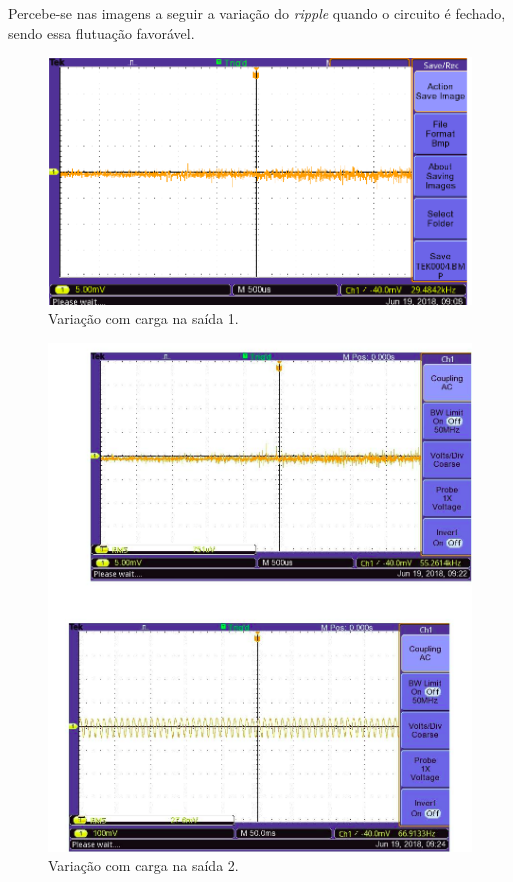 Percebe-se nas imagens a seguir a variação do \textit{ripple} quando o circuito é fechado, sendo essa flutuação favorável.

\begin{figure}[!htb]
	\centering
	\includegraphics[width=14cm]{figuras/variacao1.png}
	\caption{Variação com carga na saída 1.}
	\label{variacao1}
\end{figure}

\begin{figure}[!htb]
	\centering
	\includegraphics[width=14cm]{figuras/variacao2.png}
	\caption{Variação com carga na saída 2.}
	\label{variacao2}
\end{figure}

